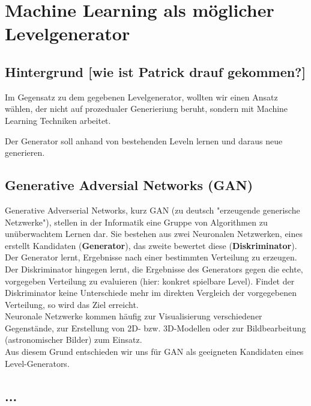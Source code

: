 \section{Machine Learning als möglicher Levelgenerator}
\subsection{Hintergrund [wie ist Patrick drauf gekommen?]}
Im Gegensatz zu dem gegebenen Levelgenerator, wollten wir einen Ansatz wählen, der nicht auf prozedualer Generieriung beruht, sondern mit Machine Learning Techniken arbeitet. 

Der Generator soll anhand von bestehenden Leveln lernen und daraus neue generieren.


\subsection{Generative Adversial Networks (GAN)}
Generative Adverserial Networks, kurz GAN (zu deutsch "erzeugende generische Netzwerke"), stellen in der Informatik eine Gruppe von Algorithmen zu unüberwachtem Lernen dar. Sie bestehen aus zwei Neuronalen Netzwerken, eines erstellt Kandidaten (\textbf{Generator}), das zweite bewertet diese (\textbf{Diskriminator}).\\Der Generator lernt, Ergebnisse nach einer bestimmten Verteilung zu erzeugen. Der Diskriminator hingegen lernt, die Ergebnisse des Generators gegen die echte, vorgegeben Verteilung zu evaluieren (hier: konkret spielbare Level). Findet der Diskriminator keine Unterschiede mehr im direkten Vergleich der vorgegebenen Verteilung, so wird das Ziel erreicht.\\Neuronale Netzwerke kommen häufig zur Visualisierung verschiedener Gegenstände, zur Erstellung von 2D- bzw. 3D-Modellen oder zur Bildbearbeitung (astronomischer Bilder) zum Einsatz.\\Aus diesem Grund entschieden wir uns für GAN als geeigneten Kandidaten eines Level-Generators.
\subsection{...}